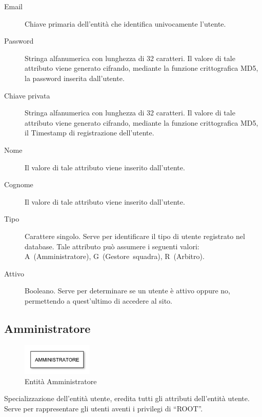 		\begin{description}
			
			\item[Email]
			Chiave primaria dell'entità che identifica univocamente l'utente.
			
			\item[Password]
			Stringa alfanumerica con lunghezza di 32 caratteri. Il valore di tale attributo viene generato cifrando, mediante la funzione crittografica MD5, la password inserita dall'utente.
			
			\item[Chiave privata]
			Stringa alfanumerica con lunghezza di 32 caratteri. Il valore di tale attributo viene generato cifrando, mediante la funzione crittografica MD5, il Timestamp di registrazione dell'utente.
			
			\item[Nome]
			Il valore di tale attributo viene inserito dall'utente.
			
			\item[Cognome]
			Il valore di tale attributo viene inserito dall'utente.
			
			\item[Tipo]
			Carattere singolo. Serve per identificare il tipo di utente registrato nel database. Tale attributo può assumere i seguenti valori:
			A~(Amministratore), G~(Gestore~squadra), R~(Arbitro).
			
			\item[Attivo]
			Booleano. Serve per determinare se un utente è attivo oppure no, permettendo a quest'ultimo di accedere al sito.
			
		\end{description}
	
	\subsection{Amministratore}
	
		\begin{figure}[h]
			\centering
			\includegraphics[width=0.3\textwidth]
			{immagini/02-amministratore}
			
			\caption{Entità Amministratore}
		\end{figure}
		
		Specializzazione dell'entità utente, eredita tutti gli attributi dell'entità utente. Serve per rappresentare gli utenti aventi i privilegi di ``ROOT''.
	
